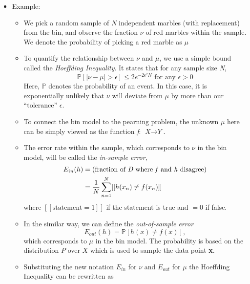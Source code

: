\documentclass[11pt]{article}
\theoremstyle{definition}
\numberwithin{equation}{section}
\begin{document}
\begin{itemize}[noitemsep, topsep=0pt]
    \item Example:
    \begin{itemize}[noitemsep, topsep=0pt]
        \item We pick a random sample of \textit{N} independent marbles (with replacement) from the bin, and observe the fraction $\nu$ of red marbles within the sample. We denote the probability of picking a red marble as $\mu$
        \item To quantify the relationship between $\nu$ and $\mu$, we use a simple bound called the \textit{Hoeffding Inequality}. It states that for any sample size \textit{N},
            \begin{equation} \label{eqn:Hoeffding Inequality}
            \mathbb{P}[|\nu - \mu| > \epsilon] \leq 2e^{-2\epsilon^2N}  \text{ for any $\epsilon > 0$}
        \end{equation}
        Here, $\mathbb{P}$ denotes the probability of an event. In this case, it is exponentially unlikely that $\nu$ will deviate from $\mu$ by more than our ``tolerance'' $\epsilon$.
        \item To connect the bin model to the pearning problem, the unknown $\mu$ here can be simply viewed as the function \textit{f}: $\textit{X} \rightarrow \textit{Y}$.
        \item The error rate within the sample, which corresponds to $\nu$ in the bin model, will be called the \textit{in-sample error},
        \begin{equation}
        \begin{aligned}
            E_{in}(h) &= \text{(fraction of \textit{D} where \textit{f} and \textit{h} disagree)}\\
                      &= \frac{1}{N} \sum_{n=1}^{N} [[h(x_n) \neq f(x_n)]]
        \end{aligned}
        \end{equation}
        where $[[\text{statement} = 1]]$ if the statement is true and $= 0$ if false.
        \item In the similar way, we can define the \textit{out-of-sample error}
        \begin{equation}
            E_{out}(h) = \mathbb{P}[h(x) \neq f(x)],
        \end{equation}
            which corresponds to $\mu$ in the bin model. The probability is based on the distribution $P$ over $X$ which is used to sample the data point \textbf{x}.
        \item Substituting the new notation $E_{in}$ for $\nu$ and $E_{out}$ for $\mu$ the Hoeffding Inequality can be rewritten as

\end{itemize}
\end{itemize}
\end{document}
